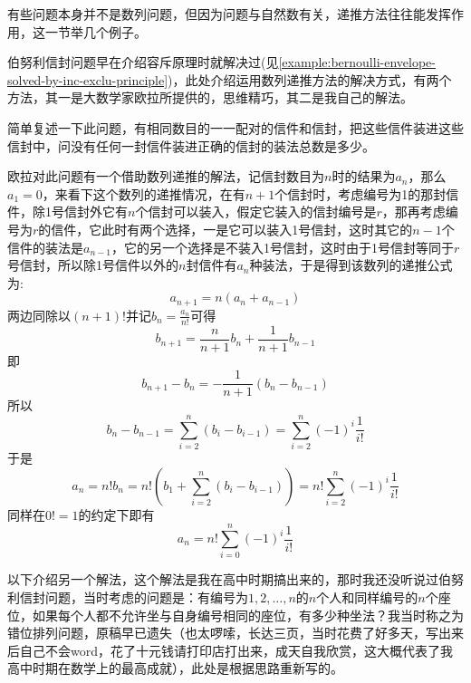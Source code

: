 有些问题本身并不是数列问题，但因为问题与自然数有关，递推方法往往能发挥作用，这一节举几个例子。

\begin{example}[伯努利信封问题]
  \label{example:bernoulli-envelope-solved-by-recursive-method}
  伯努利信封问题早在介绍容斥原理时就解决过(见\autoref{example:bernoulli-envelope-solved-by-inc-exclu-principle})，此处介绍运用数列递推方法的解决方式，有两个方法，其一是大数学家欧拉所提供的，思维精巧，其二是我自己的解法。

  简单复述一下此问题，有相同数目的一一配对的信件和信封，把这些信件装进这些信封中，问没有任何一封信件装进正确的信封的装法总数是多少。

  
  欧拉对此问题有一个借助数列递推的解法，记信封数目为$n$时的结果为$a_n$，那么$a_1=0$，来看下这个数列的递推情况，在有$n+1$个信封时，考虑编号为1的那封信件，除1号信封外它有$n$个信封可以装入，假定它装入的信封编号是$r$，那再考虑编号为$r$的信件，它此时有两个选择，一是它可以装入1号信封，这时其它的$n-1$个信件的装法是$a_{n-1}$，它的另一个选择是不装入1号信封，这时由于1号信封等同于$r$号信封，所以除1号信件以外的$n$封信件有$a_n$种装法，于是得到该数列的递推公式为:
  \begin{equation*}
    a_{n+1}=n(a_n+a_{n-1})
  \end{equation*}
  两边同除以$(n+1)!$并记$b_n=\frac{a_n}{n!}$可得
  \begin{equation*}
    b_{n+1}=\frac{n}{n+1}b_n+\frac{1}{n+1}b_{n-1}
  \end{equation*}
  即
  \begin{equation*}
    b_{n+1}-b_n=-\frac{1}{n+1}(b_n-b_{n-1})
  \end{equation*}
  所以
  \begin{equation*}
    b_n-b_{n-1}= \sum_{i=2}^{n}(b_i-b_{i-1})= \sum_{i=2}^n (-1)^{i}\frac{1}{i!}
  \end{equation*}
  于是
  \begin{equation*}
    a_n= n!b_n = n!(b_1 + \sum_{i=2}^n(b_i-b_{i-1})) = n! \sum_{i=2}^n(-1)^{i}\frac{1}{i!}
  \end{equation*}
  同样在$0!=1$的约定下即有
  \begin{equation*}
    a_n = n!\sum_{i=0}^n(-1)^{i}\frac{1}{i!}
  \end{equation*}

  以下介绍另一个解法，这个解法是我在高中时期搞出来的，那时我还没听说过伯努利信封问题，当时考虑的问题是：有编号为$1,2,\ldots,n$的$n$个人和同样编号的$n$个座位，如果每个人都不允许坐与自身编号相同的座位，有多少种坐法？我当时称之为错位排列问题，原稿早已遗失（也太啰嗦，长达三页，当时花费了好多天，写出来后自己不会word，花了十元钱请打印店打出来，成天自我欣赏，这大概代表了我高中时期在数学上的最高成就），此处是根据思路重新写的。


\end{example}
